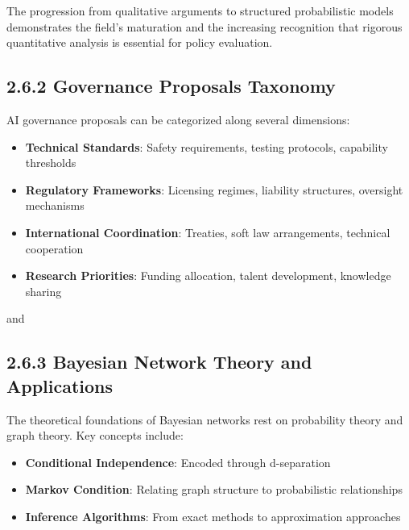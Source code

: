 \documentclass[
  11pt,
  letterpaper,
]{book}
\providecommand{\tightlist}{%
  \setlength{\itemsep}{0pt}\setlength{\parskip}{0pt}}
\begin{document}
\textcite{yudkowsky2008}

\textcite{bostrom2014}

\textcite{amodei2016}

The progression from qualitative arguments to structured probabilistic
models demonstrates the field's maturation and the increasing
recognition that rigorous quantitative analysis is essential for policy
evaluation.

\subsection*{2.6.2 Governance Proposals
Taxonomy}\label{sec-governance-taxonomy}

AI governance proposals can be categorized along several dimensions:

\begin{itemize}
\tightlist
\item
  \textbf{Technical Standards}: Safety requirements, testing protocols,
  capability thresholds
\item
  \textbf{Regulatory Frameworks}: Licensing regimes, liability
  structures, oversight mechanisms
\item
  \textbf{International Coordination}: Treaties, soft law arrangements,
  technical cooperation
\item
  \textbf{Research Priorities}: Funding allocation, talent development,
  knowledge sharing
\end{itemize}

\textcite{dafoe2021} and \textcite{dafoe2018}

\textcite{miotti2024}

\subsection*{2.6.3 Bayesian Network Theory and
Applications}\label{sec-bn-theory}

The theoretical foundations of Bayesian networks rest on probability
theory and graph theory. Key concepts include:

\begin{itemize}
\tightlist
\item
  \textbf{Conditional Independence}: Encoded through d-separation
\item
  \textbf{Markov Condition}: Relating graph structure to probabilistic
  relationships
\item
  \textbf{Inference Algorithms}: From exact methods to approximation
  approaches
\end{itemize}
\end{document}
